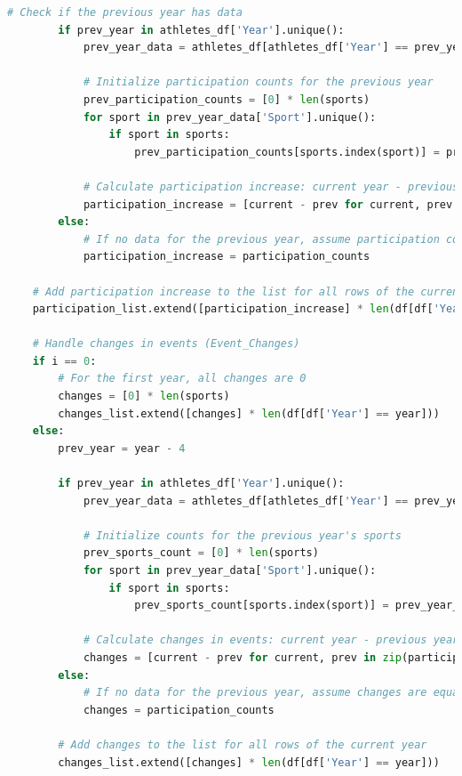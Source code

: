 \documentclass[12pt]{article}
\begin{document}
\begin{lstlisting}[language=Python, style=mystyle, caption=data\_analyze.ipynb]
        # Check if the previous year has data
        if prev_year in athletes_df['Year'].unique():
            prev_year_data = athletes_df[athletes_df['Year'] == prev_year]
            
            # Initialize participation counts for the previous year
            prev_participation_counts = [0] * len(sports)
            for sport in prev_year_data['Sport'].unique():
                if sport in sports:
                    prev_participation_counts[sports.index(sport)] = prev_year_data[prev_year_data['Sport'] == sport].shape[0]
            
            # Calculate participation increase: current year - previous year
            participation_increase = [current - prev for current, prev in zip(participation_counts, prev_participation_counts)]
        else:
            # If no data for the previous year, assume participation counts were 0
            participation_increase = participation_counts
    
    # Add participation increase to the list for all rows of the current year
    participation_list.extend([participation_increase] * len(df[df['Year'] == year]))

    # Handle changes in events (Event_Changes)
    if i == 0:
        # For the first year, all changes are 0
        changes = [0] * len(sports)
        changes_list.extend([changes] * len(df[df['Year'] == year]))
    else:
        prev_year = year - 4
        
        if prev_year in athletes_df['Year'].unique():
            prev_year_data = athletes_df[athletes_df['Year'] == prev_year]
            
            # Initialize counts for the previous year's sports
            prev_sports_count = [0] * len(sports)
            for sport in prev_year_data['Sport'].unique():
                if sport in sports:
                    prev_sports_count[sports.index(sport)] = prev_year_data[prev_year_data['Sport'] == sport].shape[0]

            # Calculate changes in events: current year - previous year
            changes = [current - prev for current, prev in zip(participation_counts, prev_sports_count)]
        else:
            # If no data for the previous year, assume changes are equal to participation counts
            changes = participation_counts
        
        # Add changes to the list for all rows of the current year
        changes_list.extend([changes] * len(df[df['Year'] == year]))


\end{lstlisting}
\end{document}
